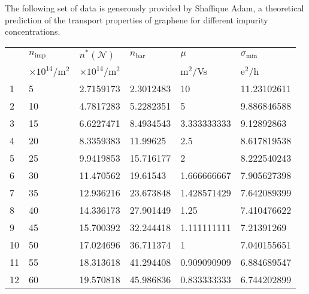 \documentclass[../Matt_Gebert_Honours_Thesis.tex]{subfiles}
\begin{document}
The following set of data is generously provided by Shaffique Adam, a theoretical prediction\cite{adam_self-consistent_2007} of the transport properties of graphene for different impurity concentrations.

\begin{longtable}[c]{l|lllll}
	\hline
	& $n_\text{imp}$                  & $n^\text{*} (\mathcal{N})$                      & $n_\text{bar}$    & $\mu$                      & $\sigma_\text{min}$             \\
	& $\times10^{14}$/m$^2$ & $\times10^{14}$/m$^2$ &           & m$^2$/Vs & e$^2$/h \\
	\hline
	\endhead
	1   & 5                       & 2.7159173               & 2.3012483 & 10                      & 11.23102611            \\
	2   & 10                      & 4.7817283               & 5.2282351 & 5                       & 9.886846588            \\
	3   & 15                      & 6.6227471               & 8.4934543 & 3.333333333             & 9.12892863             \\
	4   & 20                      & 8.3359383               & 11.99625  & 2.5                     & 8.617819538            \\
	5   & 25                      & 9.9419853               & 15.716177 & 2                       & 8.222540243            \\
	6   & 30                      & 11.470562               & 19.61543  & 1.666666667             & 7.905627398            \\
	7   & 35                      & 12.936216               & 23.673848 & 1.428571429             & 7.642089399            \\
	8   & 40                      & 14.336173               & 27.901449 & 1.25                    & 7.410476622            \\
	9   & 45                      & 15.700392               & 32.244418 & 1.111111111             & 7.21391269             \\
	10  & 50                      & 17.024696               & 36.711374 & 1                       & 7.040155651            \\
	11  & 55                      & 18.313618               & 41.294408 & 0.909090909             & 6.884689547            \\
	12  & 60                      & 19.570818               & 45.986836 & 0.833333333             & 6.744202899            \\

\end{longtable}
\end{document}
